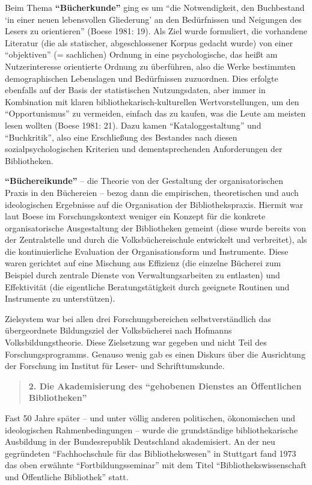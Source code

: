 \documentclass[a4paper,
fontsize=11pt,
oneside,
numbers=noperiodatend,
parskip=half-,
bibliography=totoc,
final
]{scrartcl}
\begin{document}
Beim Thema \textbf{\enquote{Bücherkunde}} ging es um \enquote{die
Notwendigkeit, den Buchbestand \enquote{in einer neuen lebensvollen
Gliederung} an den Bedürfnissen und Neigungen des Lesers zu orientieren}
(Boese 1981: 19). Als Ziel wurde formuliert, die vorhandene Literatur
(die als statischer, abgeschlossener Korpus gedacht wurde) von einer
\enquote{objektiven} (= sachlichen) Ordnung in eine psychologische, das
heißt am Nutzerinteresse orientierte Ordnung zu überführen, also die
Werke bestimmten demographischen Lebenslagen und Bedürfnissen
zuzuordnen. Dies erfolgte ebenfalls auf der Basis der statistischen
Nutzungsdaten, aber immer in Kombination mit klaren
bibliothekarisch-kulturellen Wertvorstellungen, um den
\enquote{Opportunismus} zu vermeiden, einfach das zu kaufen, was die
Leute am meisten lesen wollten (Boese 1981: 21). Dazu kamen
\enquote{Kataloggestaltung} und \enquote{Buchkritik}, also eine
Erschließung des Bestandes nach diesen sozialpsychologischen Kriterien
und dementsprechenden Anforderungen der Bibliotheken.

\textbf{\enquote{Büchereikunde}} -- die Theorie von der Gestaltung der
organisatorischen Praxis in den Büchereien -- bezog dann die
empirischen, theoretischen und auch ideologischen Ergebnisse auf die
Organisation der Bibliothekspraxis. Hiermit war laut Boese im
Forschungskontext weniger ein Konzept für die konkrete organisatorische
Ausgestaltung der Bibliotheken gemeint (diese wurde bereits von der
Zentralstelle und durch die Volksbüchereischule entwickelt und
verbreitet), als die kontinuierliche Evaluation der Organisationsform
und Instrumente. Diese waren gerichtet auf eine Mischung aus Effizienz
(die einzelne Bücherei zum Beispiel durch zentrale Dienste von
Verwaltungsarbeiten zu entlasten) und Effektivität (die eigentliche
Beratungstätigkeit durch geeignete Routinen und Instrumente zu
unterstützen).

Zielsystem war bei allen drei Forschungsbereichen selbstverständlich das
übergeordnete Bildungsziel der Volksbücherei nach Hofmanns
Volksbildungstheorie. Diese Zielsetzung war gegeben und nicht Teil des
Forschungsprogramms. Genauso wenig gab es einen Diskurs über die
Ausrichtung der Forschung im Institut für Leser- und Schrifttumskunde.

\begin{quote}
\textbf{2. Die Akademisierung des \enquote{gehobenen Dienstes an
Öffentlichen Bibliotheken}}
\end{quote}

Fast 50 Jahre später -- und unter völlig anderen politischen,
ökonomischen und ideologischen Rahmenbedingungen -- wurde die
grundständige bibliothekarische Ausbildung in der Bundesrepublik
Deutschland akademisiert. An der neu gegründeten \enquote{Fachhochschule
für das Bibliothekswesen} in Stuttgart fand 1973 das oben erwähnte
\enquote{Fortbildungsseminar} mit dem Titel
\enquote{Bibliothekswissenschaft und Öffentliche Bibliothek} statt.
\end{document}
